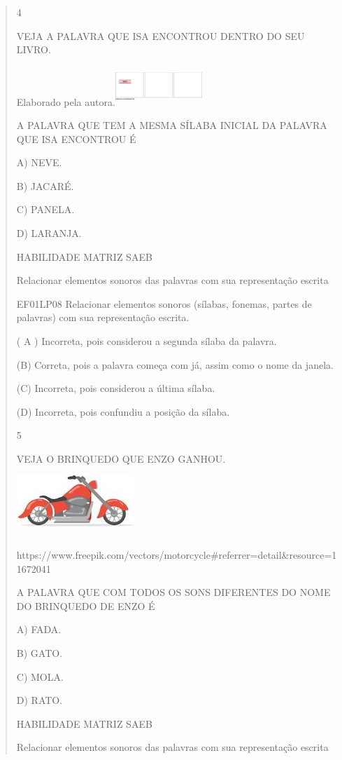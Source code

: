 \begin{escola}
{\begin{verse}
\num{4}

VEJA A PALAVRA QUE ISA ENCONTROU DENTRO DO SEU LIVRO.

Elaborado pela
autora.\includegraphics[width=1.29722in,height=0.57917in]{media/image244.png}

A PALAVRA QUE TEM A MESMA SÍLABA INICIAL DA PALAVRA QUE ISA ENCONTROU É

A) NEVE.

B) JACARÉ.

C) PANELA.

D) LARANJA.

HABILIDADE MATRIZ SAEB

Relacionar elementos sonoros das palavras com sua representação escrita

EF01LP08 Relacionar elementos sonoros (sílabas, fonemas, partes de
palavras) com sua representação escrita.

( A ) Incorreta, pois considerou a segunda sílaba da palavra.

(B) Correta, pois a palavra começa com já, assim como o nome da janela.

(C) Incorreta, pois considerou a última sílaba.

(D) Incorreta, pois confundiu a posição da
sílaba.\protect\hypertarget{_heading=h.33l0sngjt3hj}{}{}

\num{5}

VEJA O BRINQUEDO QUE ENZO
GANHOU.\includegraphics[width=1.73681in,height=1.03125in]{media/image245.jpg}

https://www.freepik.com/vectors/motorcycle\#referrer=detail\&resource=11672041

A PALAVRA QUE COM TODOS OS SONS DIFERENTES DO NOME DO BRINQUEDO DE ENZO
É

A) FADA.

B) GATO.

C) MOLA.

D) RATO.

HABILIDADE MATRIZ SAEB

Relacionar elementos sonoros das palavras com sua representação escrita


\end{verse}}
\end{escola}
